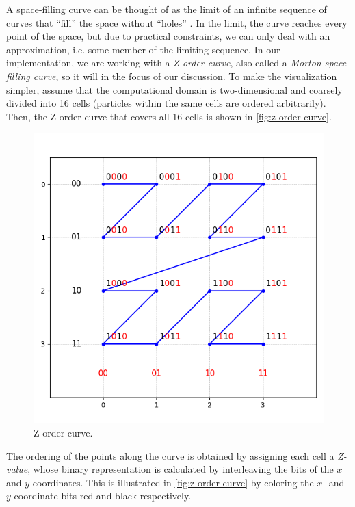 A space-filling curve can be thought of as the limit of an infinite sequence of curves that ``fill'' the space without ``holes'' \cite{WeissteinPlaneFilling}.
In the limit, the curve reaches every point of the space, but due to practical constraints, we can only deal with an approximation, i.e. some member of the limiting sequence.
In our implementation, we are working with a \textit{Z-order curve}, also called a \textit{Morton space-filling curve}, so it will in the focus of our discussion.
To make the visualization simpler, assume that the computational domain is two-dimensional and coarsely divided into 16 cells (particles within the same cells are ordered arbitrarily).
Then, the Z-order curve that covers all 16 cells is shown in \autoref{fig:z-order-curve}.
\begin{figure}[htp]
    \centering
    \includegraphics[scale=0.5]{chapters/barnes-hut/img/z-order.png}
    \caption{Z-order curve.}
    \label{fig:z-order-curve}
\end{figure}
The ordering of the points along the curve is obtained by assigning each cell a \textit{Z-value}, whose binary representation is calculated by interleaving the bits of the $x$ and $y$ coordinates.
This is illustrated in \autoref{fig:z-order-curve} by coloring the $x$- and $y$-coordinate bits red and black respectively.


